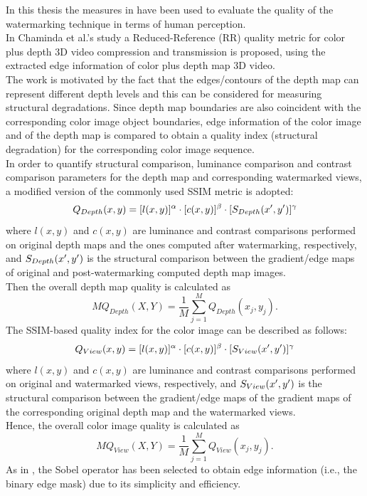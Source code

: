 In this thesis the measures in \cite{QMETRICS} have been used to evaluate the quality of the watermarking technique in terms of human perception.\\
In Chaminda et al.'s study a Reduced-Reference
(RR) quality metric for color plus depth 3D video compression and transmission is proposed, using the extracted edge information of color plus depth map 3D video.\\ 
The work is motivated by the fact that the edges/contours of the depth map can represent different depth levels and this can be considered for measuring structural degradations. Since depth map boundaries are also coincident with the corresponding color image object boundaries, edge information of the color image and of the depth map is compared to obtain a quality index (structural degradation) for the corresponding color image sequence.\\
In order to quantify structural comparison, luminance comparison and contrast comparison parameters for the depth map and corresponding watermarked views, a modified version of the
commonly used SSIM metric is adopted:
\begin{equation}
Q_{Depth}(x,y) = [l(x,y)]^{\alpha} \cdot [c(x,y)]^{\beta} \cdot [\mathnormal{S}_{Depth}(x',y')]^{\gamma}
\end{equation}
where $l(x,y)$ and $c(x,y)$ are luminance and contrast comparisons performed on original depth maps and the ones computed after watermarking,
respectively, and $\mathnormal{S}_{Depth}(x',y')$  is the structural comparison between the gradient/edge maps of original and post-watermarking computed depth map images.\\
Then the overall depth map quality is calculated as
\begin{equation}
MQ_{Depth}(X,Y) = \frac{1}{M} \sum_{j=1}^{M}Q_{Depth}(x_{j},y_{j}).
\end{equation}
The SSIM-based quality index for the color image can be described as follows:
\begin{equation}
Q_{View}(x,y) = [l(x,y)]^{\alpha} \cdot [c(x,y)]^{\beta} \cdot [\mathnormal{S}_{View}(x',y')]^{\gamma}
\end{equation}
where $l(x,y)$ and $c(x,y)$ are luminance and contrast comparisons performed on original and watermarked views, respectively, and $\mathnormal{S}_{View}(x',y')$  is the structural comparison between the gradient/edge maps of the gradient maps of the corresponding original depth map and the watermarked views.\\
Hence, the overall color image quality is calculated as
\begin{equation}
MQ_{View}(X,Y) = \frac{1}{M} \sum_{j=1}^{M}Q_{View}(x_{j},y_{j}).
\end{equation}
As in \cite{QMETRICS}, the Sobel operator has been selected to obtain edge information (i.e., the binary edge mask) due to its simplicity and efficiency.\\

